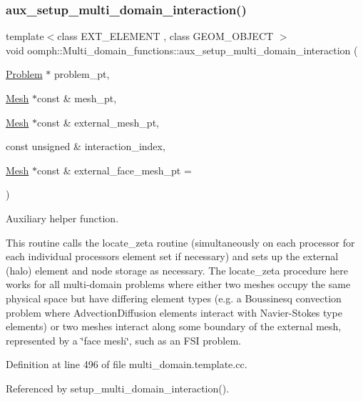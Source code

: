 \subsubsection{\texorpdfstring{aux\+\_\+setup\+\_\+multi\+\_\+domain\+\_\+interaction()}{aux\_setup\_multi\_domain\_interaction()}\hspace{0.1cm}{\footnotesize\ttfamily [1/2]}}
{\footnotesize\ttfamily template$<$class E\+X\+T\+\_\+\+E\+L\+E\+M\+E\+NT , class G\+E\+O\+M\+\_\+\+O\+B\+J\+E\+CT $>$ \\
void oomph\+::\+Multi\+\_\+domain\+\_\+functions\+::aux\+\_\+setup\+\_\+multi\+\_\+domain\+\_\+interaction (\begin{DoxyParamCaption}\item[{\hyperlink{classoomph_1_1Problem}{Problem} $\ast$}]{problem\+\_\+pt,  }\item[{\hyperlink{classoomph_1_1Mesh}{Mesh} $\ast$const \&}]{mesh\+\_\+pt,  }\item[{\hyperlink{classoomph_1_1Mesh}{Mesh} $\ast$const \&}]{external\+\_\+mesh\+\_\+pt,  }\item[{const unsigned \&}]{interaction\+\_\+index,  }\item[{\hyperlink{classoomph_1_1Mesh}{Mesh} $\ast$const \&}]{external\+\_\+face\+\_\+mesh\+\_\+pt = {} }\end{DoxyParamCaption})}



Auxiliary helper function. 

This routine calls the locate\+\_\+zeta routine (simultaneously on each processor for each individual processor\textquotesingle{}s element set if necessary) and sets up the external (halo) element and node storage as necessary. The locate\+\_\+zeta procedure here works for all multi-\/domain problems where either two meshes occupy the same physical space but have differing element types (e.\+g. a Boussinesq convection problem where Advection\+Diffusion elements interact with Navier-\/\+Stokes type elements) or two meshes interact along some boundary of the external mesh, represented by a \char`\"{}face mesh\char`\"{}, such as an F\+SI problem. 

Definition at line 496 of file multi\+\_\+domain.\+template.\+cc.



Referenced by setup\+\_\+multi\+\_\+domain\+\_\+interaction().

\mbox{\label{namespaceoomph_1_1Multi__domain__functions_a8b31c549df27f7cf183bfb28faf375ce}} 
